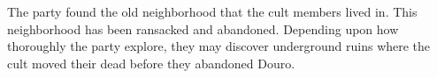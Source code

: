The party found the old neighborhood that the cult members lived in.
This neighborhood has been ransacked and abandoned.
Depending upon how thoroughly the party explore, they may discover underground ruins where the cult moved their dead before they abandoned Douro.
